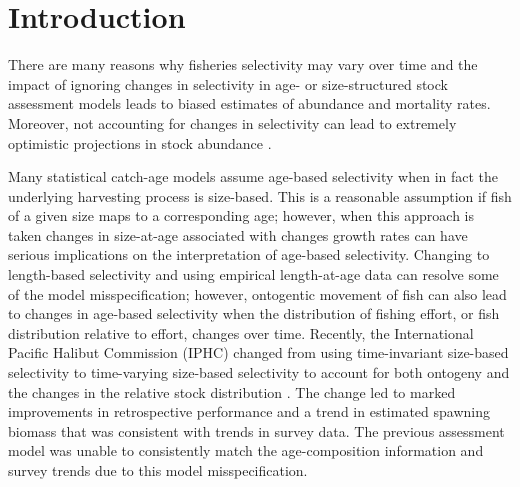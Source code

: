 
\section*{Introduction} %
\label{sec:introduction}
There are many reasons why fisheries selectivity may vary over time and the impact of ignoring changes in selectivity in age- or size-structured stock assessment models leads to biased estimates of abundance and mortality rates.  Moreover, not accounting for changes in selectivity can lead to extremely optimistic projections in stock abundance \citep[e.g., 2J3KL cod stocks,][]{walters1996lessons}. 

Many statistical catch-age models assume age-based selectivity when in fact the underlying harvesting process is size-based. This is a reasonable assumption if fish of a given size maps to a corresponding age; however, when this approach is taken changes in size-at-age associated with changes growth rates can have serious implications on the interpretation of age-based selectivity. Changing to length-based selectivity and using empirical length-at-age data can resolve some of the model misspecification; however, ontogentic movement of fish can also lead to changes in age-based selectivity when the distribution of fishing effort, or fish distribution relative to effort, changes over time.  Recently, the International Pacific Halibut Commission (IPHC) changed from using time-invariant size-based selectivity to time-varying size-based selectivity to account for both ontogeny and the changes in the relative stock distribution 
\citep{stewart2012assessment}.  The change led to marked improvements in retrospective performance and a trend in estimated spawning biomass that was consistent with trends in survey data.  The previous assessment model was unable to consistently match the age-composition information and survey trends due to this model misspecification.


